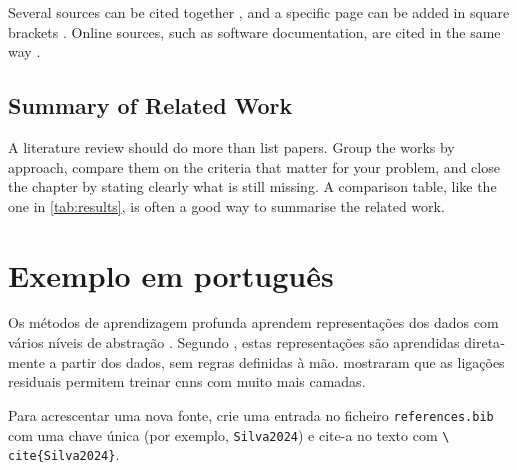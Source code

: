 Several sources can be cited together \cite{LeCun2015,He2016}, and a
specific page can be added in square brackets \cite[p.~164]{Goodfellow2016}.
Online sources, such as software documentation, are cited in the same way
\cite{CTANbiblatexieee}.

\subsection{Summary of Related Work}
\label{sec:review:summary}

A literature review should do more than list papers. Group the works by
approach, compare them on the criteria that matter for your problem, and
close the chapter by stating clearly what is still missing. A comparison
table, like the one in \cref{tab:results}, is often a good way to summarise
the related work.

\section{Exemplo em português}
\label{sec:review:pt}

\begin{otherlanguage}{portuguese}

Os métodos de aprendizagem profunda aprendem representações dos dados com
vários níveis de abstração \cite{LeCun2015}. Segundo
\textcite{Goodfellow2016}, estas representações são aprendidas diretamente a
partir dos dados, sem regras definidas à mão. \textcite{He2016} mostraram que
as ligações residuais permitem treinar \glspl{cnn} com muito mais camadas.

Para acrescentar uma nova fonte, crie uma entrada no ficheiro
\texttt{references.bib} com uma chave única (por exemplo,
\texttt{Silva2024}) e cite-a no texto com \texttt{\textbackslash
cite\{Silva2024\}}.

\end{otherlanguage}

